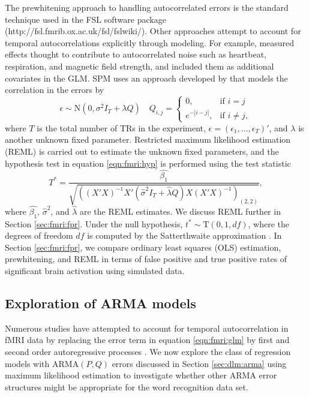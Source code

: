 The prewhitening approach to handling autocorrelated errors is the standard technique used in the FSL software package (http://fsl.fmrib.ox.ac.uk/fsl/fslwiki/). Other approaches attempt to account for temporal autocorrelations explicitly through modeling. For example, \citet{lund:mad:nvr:2006} measured effects thought to contribute to autocorrelated noise such as heartbeat, respiration, and magnetic field strength, and included them as additional covariates in the GLM. SPM uses an approach developed by \citet{kiebel:holmes:spm:2007} that models the correlation in the errors by
\begin{equation}
\epsilon \sim \mbox{N}(0,\sigma^2 I_T + \lambda Q) \quad Q_{i,j} = \left\{\begin{array}{ll} 0, & \mbox{if } i=j \\ e^{-|i-j|}, & \mbox{if } i\ne j, \end{array} \right. \label{eqn:fmri:kiebel}
\end{equation}
where $T$ is the total number of TRs in the experiment, $\epsilon = (\epsilon_1,\ldots,\epsilon_T)'$, and $\lambda$ is another unknown fixed parameter. Restricted maximum likelihood estimation (REML) is carried out to estimate the unknown fixed parameters, and the hypothesis test in equation \eqref{eqn:fmri:hyp} is performed using the test statistic
\begin{equation}
T^* = \frac{\hat{\beta_1}}{\sqrt{\left((X'X)^{-1}X'(\hat{\sigma}^2 I_T + \hat{\lambda} Q)X(X'X)^{-1}\right)_{(2,2)}}}, \label{eqn:fmri:hyp-reml}
\end{equation}
where $\hat{\beta_1}$, $\hat{\sigma}^2$, and $\hat{\lambda}$ are the REML estimates. We discuss REML further in Section \ref{sec:fmri:fpr}. Under the null hypothesis, $t^* \sim \mbox{T}(0,1,df)$, where the degrees of freedom $df$ is computed by the Satterthwaite approximation \citep{wors:frist:color:1995}. In Section \ref{sec:fmri:fpr}, we compare ordinary least squares (OLS) estimation, prewhitening, and REML in terms of false positive and true positive rates of significant brain activation using simulated data.

\subsection{Exploration of ARMA models \label{sec:fmri:arma}}

Numerous studies have attempted to account for temporal autocorrelation in fMRI data by replacing the error term in equation \eqref{eqn:fmri:glm} by first and second order autoregressive processes \citep{bullmore:prewhiten:1996, loc:jos:arma:1997}. We now explore the class of regression models with $\mbox{ARMA}(P,Q)$ errors discussed in Section \ref{sec:dlm:arma} using maximum likelihood estimation to investigate whether other ARMA error structures might be appropriate for the word recognition data set.

